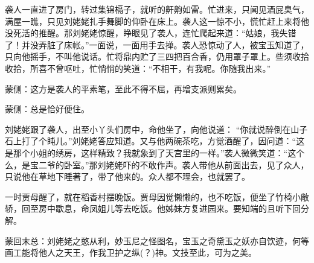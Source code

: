 \begin{parag}
    袭人一直进了房门，转过集锦槅子，就听的鼾齁如雷。忙进来，只闻见酒屁臭气，满屋一瞧，只见刘姥姥扎手舞脚的仰卧在床上。袭人这一惊不小，慌忙赶上来将他没死活的推醒。那刘姥姥惊醒，睁眼见了袭人，连忙爬起来道：“姑娘，我失错了！并没弄脏了床帐。”一面说，一面用手去掸。袭人恐惊动了人，被宝玉知道了，只向他摇手，不叫他说话。忙将鼎内贮了三四把百合香，仍用罩子罩上。些须收拾收拾，所喜不曾呕吐，忙悄悄的笑道：“不相干，有我呢。你随我出来。”\begin{note}蒙侧：这方是袭人的平素笔，至此不得不屈，再增支派则累矣。\end{note}\begin{note}蒙侧：总是恰好便住。\end{note}刘姥姥跟了袭人，出至小丫头们房中，命他坐了，向他说道： “你就说醉倒在山子石上打了个盹儿。”刘姥姥答应知道。又与他两碗茶吃，方觉酒醒了，因问道：“这是那个小姐的绣房，这样精致？我就象到了天宫里的一样。”袭人微微笑道：“这个么，是宝二爷的卧室。”那刘姥姥吓的不敢作声。袭人带他从前面出去，见了众人，只说他在草地下睡著了，带了他来的。众人都不理会，也就罢了。
\end{parag}


\begin{parag}
    一时贾母醒了，就在稻香村摆晚饭。贾母因觉懒懒的，也不吃饭，便坐了竹椅小敞轿，回至房中歇息，命凤姐儿等去吃饭。他姊妹方复进园来。要知端的且听下回分解。
\end{parag}


\begin{parag}
    \begin{note}蒙回末总：刘姥姥之憨从利，妙玉尼之怪图名，宝玉之奇黛玉之妖亦自饮迹，何等画工能将他人之天王，作我卫护之纵(？)神。文技至此，可为之美。\end{note}
\end{parag}

